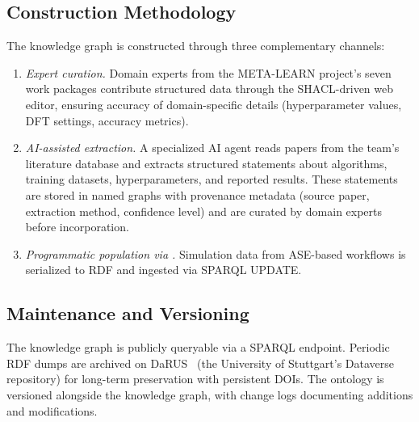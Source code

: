 \subsection{Construction Methodology}

The knowledge graph is constructed through three complementary channels:

\begin{enumerate}
\item \emph{Expert curation.} Domain experts from the META-LEARN project's
  seven work packages contribute structured data through the SHACL-driven
  web editor, ensuring accuracy of domain-specific details (hyperparameter
  values, DFT settings, accuracy metrics).

\item \emph{AI-assisted extraction.} A specialized AI agent reads papers from
  the team's literature database and extracts structured statements about
  algorithms, training datasets, hyperparameters, and reported results. These
  statements are stored in named graphs with provenance metadata (source paper,
  extraction method, confidence level) and are curated by domain experts before
  incorporation.

\item \emph{Programmatic population via \SemASE{}.} Simulation data from
  ASE-based workflows is serialized to RDF and ingested via SPARQL UPDATE.
\end{enumerate}

\subsection{Maintenance and Versioning}

The knowledge graph is publicly queryable via a SPARQL endpoint. Periodic RDF
dumps are archived on DaRUS~\cite{darus2024} (the University of Stuttgart's
Dataverse repository) for long-term preservation with persistent DOIs. The
ontology is versioned alongside the knowledge graph, with change logs
documenting additions and modifications.

